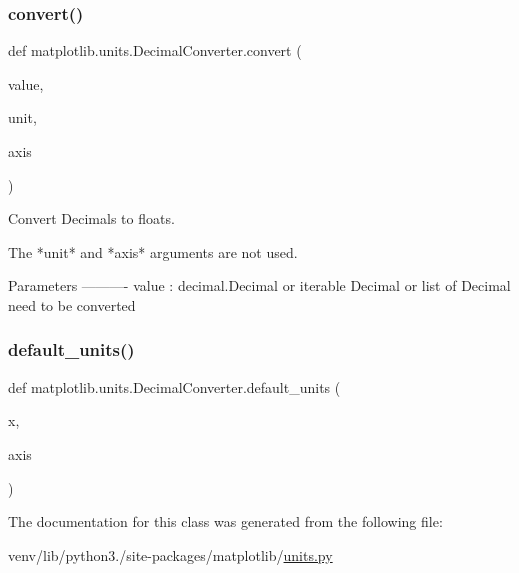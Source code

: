 \subsubsection{\texorpdfstring{convert()}{convert()}}
{\footnotesize\ttfamily def matplotlib.\+units.\+Decimal\+Converter.\+convert (\begin{DoxyParamCaption}\item[{}]{value,  }\item[{}]{unit,  }\item[{}]{axis }\end{DoxyParamCaption})\hspace{0.3cm}{\ttfamily [static]}}

\begin{DoxyVerb}Convert Decimals to floats.

The *unit* and *axis* arguments are not used.

Parameters
----------
value : decimal.Decimal or iterable
    Decimal or list of Decimal need to be converted
\end{DoxyVerb}
 \mbox{\label{classmatplotlib_1_1units_1_1DecimalConverter_a2930558bb899f089d2cf495ddb37c2c5}} 
\subsubsection{\texorpdfstring{default\+\_\+units()}{default\_units()}}
{\footnotesize\ttfamily def matplotlib.\+units.\+Decimal\+Converter.\+default\+\_\+units (\begin{DoxyParamCaption}\item[{}]{x,  }\item[{}]{axis }\end{DoxyParamCaption})\hspace{0.3cm}{\ttfamily [static]}}



The documentation for this class was generated from the following file\+:\begin{DoxyCompactItemize}
\item 
venv/lib/python3./site-\/packages/matplotlib/\hyperlink{units_8py}{units.\+py}\end{DoxyCompactItemize}
